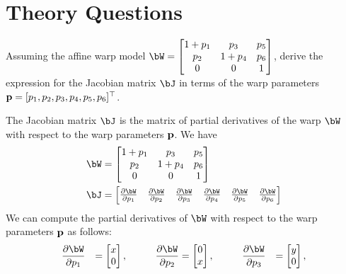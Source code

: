 \section{Theory Questions}

\begin{problem}
  Assuming the affine warp model
  $\displaystyle \bW = \begin{bmatrix}
      1 + p_1 & p_3 & p_5 \\ p_2 & 1 + p_4 & p_6 \\ 0 & 0 & 1 \end{bmatrix}$,
  derive the expression for the Jacobian matrix
  $\bJ$ in terms of the warp parameters $\mathbf{p} = [p_1, p_2, p_3, p_4, p_5, p_6]^\top$.

  \begin{answer}
    The Jacobian matrix $\bJ$ is the matrix of partial derivatives of the warp
    $\bW$ with respect to the warp parameters $\mathbf{p}$. We have
    \begin{align*}
      \bW &= \begin{bmatrix}
        1 + p_1 & p_3 & p_5 \\ p_2 & 1 + p_4 & p_6 \\ 0 & 0 & 1
      \end{bmatrix} \\
      \bJ &= \begin{bmatrix}
        \frac{\partial \bW}{\partial p_1} & \frac{\partial \bW}{\partial p_2}
        & \frac{\partial \bW}{\partial p_3} & \frac{\partial \bW}{\partial p_4}
        & \frac{\partial \bW}{\partial p_5} & \frac{\partial \bW}{\partial p_6}
      \end{bmatrix}
    \end{align*}
    We can compute the partial derivatives of $\bW$ with respect to the warp
    parameters $\mathbf{p}$ as follows:
    \begin{alignat*}{5}
      &\frac{\partial \bW}{\partial p_1} &= \begin{bmatrix}
        x \\ 0
      \end{bmatrix}, \qquad
      &&\frac{\partial \bW}{\partial p_2} &= \begin{bmatrix}
        0 \\ x
      \end{bmatrix}, \qquad
      &&\frac{\partial \bW}{\partial p_3} &= \begin{bmatrix}
      y \\ 0
      \end{bmatrix}, \\

\end{alignat*}
\end{answer}
\end{problem}
